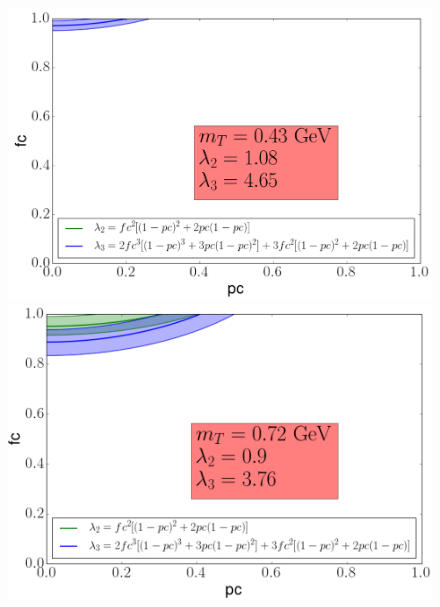 \documentclass{beamer}
\begin{document}
\begin{frame}
\begin{figure}
\includegraphics[scale=0.2]{pic/fcpc/3}
\includegraphics[scale=0.2]{pic/fcpc/4}
\end{figure}
\end{frame}
\end{document}

